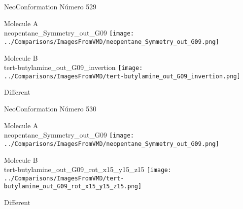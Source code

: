  \newpage

\vtab[-3cm]
\begin{center}
{\large NeoConformation \tab Número 529}
\end{center}
\begin{multicols}{2}
\begin{center}
Molecule A \\ 
neopentane\_Symmetry\_out\_G09
\texttt{[image: ../Comparisons/ImagesFromVMD/neopentane\_Symmetry\_out\_G09.png]}
\\
\vtab

\columnbreak
Molecule B \\ 
tert-butylamine\_out\_G09\_invertion
\texttt{[image: ../Comparisons/ImagesFromVMD/tert-butylamine\_out\_G09\_invertion.png]}
\\
\vtab


\end{center}
\end{multicols}
\begin{center}
\textcolor{NavyBlue}{\Large Different}
\end{center}

 \newpage

\vtab[-3cm]
\begin{center}
{\large NeoConformation \tab Número 530}
\end{center}
\begin{multicols}{2}
\begin{center}
Molecule A \\ 
neopentane\_Symmetry\_out\_G09
\texttt{[image: ../Comparisons/ImagesFromVMD/neopentane\_Symmetry\_out\_G09.png]}
\\
\vtab

\columnbreak
Molecule B \\ 
tert-butylamine\_out\_G09\_rot\_x15\_y15\_z15
\texttt{[image: ../Comparisons/ImagesFromVMD/tert-butylamine\_out\_G09\_rot\_x15\_y15\_z15.png]}
\\
\vtab


\end{center}
\end{multicols}
\begin{center}
\textcolor{NavyBlue}{\Large Different}
\end{center}

 \newpage

